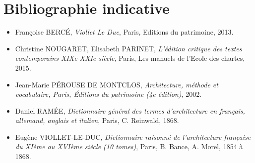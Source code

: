\documentclass{article}
\begin{document}
\section*{Bibliographie indicative}


\begin{itemize}
\item  Françoise BERCÉ, \textit{Viollet Le Duc}, Paris, Editions du patrimoine, 2013. 


\item Christine NOUGARET, Elisabeth PARINET, \textit{L’édition critique des textes contemporains XIXe-XXIe siècle}, Paris, Les manuels de l’Ecole des chartes, 2015. 

\item Jean-Marie PÉROUSE DE MONTCLOS, \textit{Architecture, méthode et vocabulaire, Paris, Éditions du patrimoine (4e édition)}, 2002. 

\item Daniel RAMÉE, \textit{Dictionnaire général des termes d'architecture en français, allemand, anglais et italien}, Paris, C. Reinwald, 1868.

\item Eugène VIOLLET-LE-DUC, \textit{Dictionnaire raisonné de l'architecture française du XIème au XVIème siècle (10 tomes)}, 
Paris, B. Bance, A. Morel, 1854 à 1868.

\end{itemize}
\end{document}
